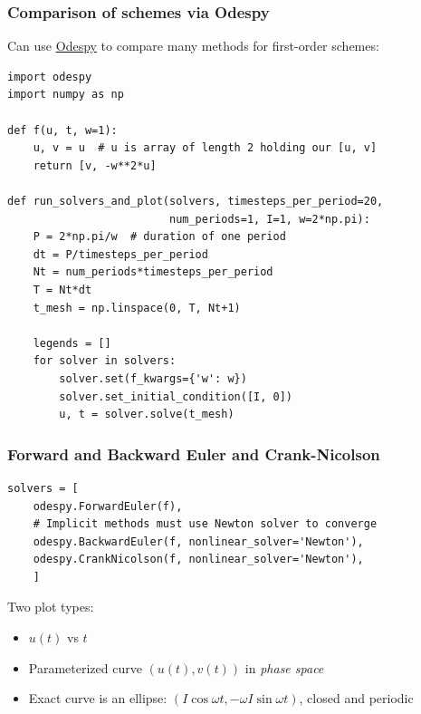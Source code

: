 \documentclass{beamer}
\begin{document}
\begin{frame}
\frametitle{Comparison of schemes via Odespy}

Can use
\href{{https://github.com/hplgit/odespy}}{Odespy} to compare many methods
for first-order schemes:

\begin{verbatim}
import odespy
import numpy as np

def f(u, t, w=1):
    u, v = u  # u is array of length 2 holding our [u, v]
    return [v, -w**2*u]

def run_solvers_and_plot(solvers, timesteps_per_period=20,
                         num_periods=1, I=1, w=2*np.pi):
    P = 2*np.pi/w  # duration of one period
    dt = P/timesteps_per_period
    Nt = num_periods*timesteps_per_period
    T = Nt*dt
    t_mesh = np.linspace(0, T, Nt+1)

    legends = []
    for solver in solvers:
        solver.set(f_kwargs={'w': w})
        solver.set_initial_condition([I, 0])
        u, t = solver.solve(t_mesh)
\end{verbatim}
\end{frame}

\begin{frame}
\frametitle{Forward and Backward Euler and Crank-Nicolson}

\begin{verbatim}
solvers = [
    odespy.ForwardEuler(f),
    # Implicit methods must use Newton solver to converge
    odespy.BackwardEuler(f, nonlinear_solver='Newton'),
    odespy.CrankNicolson(f, nonlinear_solver='Newton'),
    ]
\end{verbatim}

Two plot types:

\begin{itemize}
  \item $u(t)$ vs $t$

  \item Parameterized curve $(u(t), v(t))$ in \emph{phase space}

  \item Exact curve is an ellipse: $(I\cos\omega t, -\omega I\sin\omega t)$,
    closed and periodic
\end{itemize}

\noindent
\end{frame}
\end{document}
